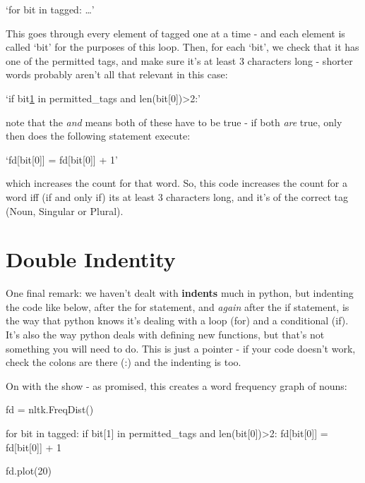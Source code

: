 \documentclass[
  letterpaper,
  DIV=11,
  numbers=noendperiod]{scrreprt}
\newenvironment{Shaded}{\begin{snugshade}}{\end{snugshade}}
\newcommand{\BuiltInTok}[1]{\textcolor[rgb]{0.00,0.23,0.31}{#1}}
\newcommand{\ControlFlowTok}[1]{\textcolor[rgb]{0.00,0.23,0.31}{#1}}
\newcommand{\DecValTok}[1]{\textcolor[rgb]{0.68,0.00,0.00}{#1}}
\newcommand{\KeywordTok}[1]{\textcolor[rgb]{0.00,0.23,0.31}{#1}}
\newcommand{\NormalTok}[1]{\textcolor[rgb]{0.00,0.23,0.31}{#1}}
\newcommand{\OperatorTok}[1]{\textcolor[rgb]{0.37,0.37,0.37}{#1}}
\begin{document}
`for bit in tagged: \ldots'

This goes through every element of tagged one at a time - and each
element is called `bit' for the purposes of this loop. Then, for each
`bit', we check that it has one of the permitted tags, and make sure
it's at least 3 characters long - shorter words probably aren't all that
relevant in this case:

`if bit\href{http://www.literateprogramming.com/lpquotes.html}{1} in
permitted\_tags and len(bit{[}0{]})\textgreater2:'

note that the \emph{and} means both of these have to be true - if both
\emph{are} true, only then does the following statement execute:

`fd{[}bit{[}0{]}{]} = fd{[}bit{[}0{]}{]} + 1'

which increases the count for that word. So, this code increases the
count for a word iff (if and only if) its at least 3 characters long,
and it's of the correct tag (Noun, Singular or Plural).

\hypertarget{double-indentity}{%
\section{Double Indentity}\label{double-indentity}}

One final remark: we haven't dealt with \textbf{indents} much in python,
but indenting the code like below, after the for statement, and
\emph{again} after the if statement, is the way that python knows it's
dealing with a loop (for) and a conditional (if). It's also the way
python deals with defining new functions, but that's not something you
will need to do. This is just a pointer - if your code doesn't work,
check the colons are there (:) and the indenting is too.

On with the show - as promised, this creates a word frequency graph of
nouns:

\begin{Shaded}
\begin{Highlighting}[]
\NormalTok{fd }\OperatorTok{=}\NormalTok{ nltk.FreqDist()}

\ControlFlowTok{for}\NormalTok{ bit }\KeywordTok{in}\NormalTok{ tagged:}
    \ControlFlowTok{if}\NormalTok{ bit[}\DecValTok{1}\NormalTok{] }\KeywordTok{in}\NormalTok{ permitted\_tags }\KeywordTok{and} \BuiltInTok{len}\NormalTok{(bit[}\DecValTok{0}\NormalTok{])}\OperatorTok{\textgreater{}}\DecValTok{2}\NormalTok{:}
\NormalTok{        fd[bit[}\DecValTok{0}\NormalTok{]] }\OperatorTok{=}\NormalTok{ fd[bit[}\DecValTok{0}\NormalTok{]] }\OperatorTok{+} \DecValTok{1}
        
\NormalTok{fd.plot(}\DecValTok{20}\NormalTok{)}
\end{Highlighting}
\end{Shaded}
\end{document}
